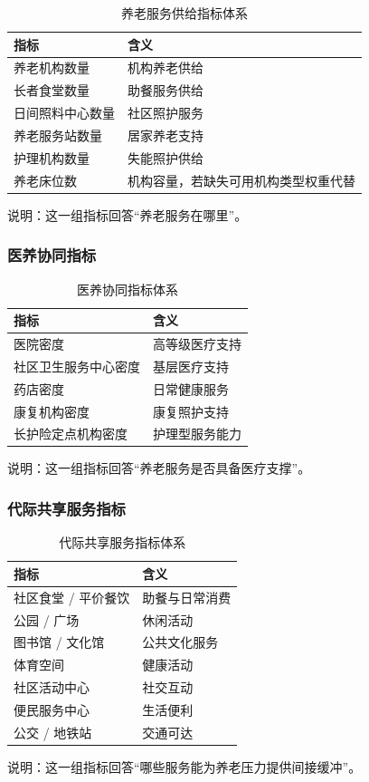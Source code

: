 \begin{table}[H]
\centering
\caption{养老服务供给指标体系}
\begin{tabular}{ll}
\toprule
\rowcolor{tablehead}
指标 & 含义 \\
\midrule
养老机构数量 & 机构养老供给 \\
长者食堂数量 & 助餐服务供给 \\
日间照料中心数量 & 社区照护服务 \\
养老服务站数量 & 居家养老支持 \\
护理机构数量 & 失能照护供给 \\
养老床位数 & 机构容量，若缺失可用机构类型权重代替 \\
\bottomrule
\end{tabular}
\end{table}

说明：这一组指标回答“养老服务在哪里”。

\subsubsection{医养协同指标}

\begin{table}[H]
\centering
\caption{医养协同指标体系}
\begin{tabular}{ll}
\toprule
\rowcolor{tablehead}
指标 & 含义 \\
\midrule
医院密度 & 高等级医疗支持 \\
社区卫生服务中心密度 & 基层医疗支持 \\
药店密度 & 日常健康服务 \\
康复机构密度 & 康复照护支持 \\
长护险定点机构密度 & 护理型服务能力 \\
\bottomrule
\end{tabular}
\end{table}

说明：这一组指标回答“养老服务是否具备医疗支撑”。

\subsubsection{代际共享服务指标}

\begin{table}[H]
\centering
\caption{代际共享服务指标体系}
\begin{tabular}{ll}
\toprule
\rowcolor{tablehead}
指标 & 含义 \\
\midrule
社区食堂 / 平价餐饮 & 助餐与日常消费 \\
公园 / 广场 & 休闲活动 \\
图书馆 / 文化馆 & 公共文化服务 \\
体育空间 & 健康活动 \\
社区活动中心 & 社交互动 \\
便民服务中心 & 生活便利 \\
公交 / 地铁站 & 交通可达 \\
\bottomrule
\end{tabular}
\end{table}

说明：这一组指标回答“哪些服务能为养老压力提供间接缓冲”。
